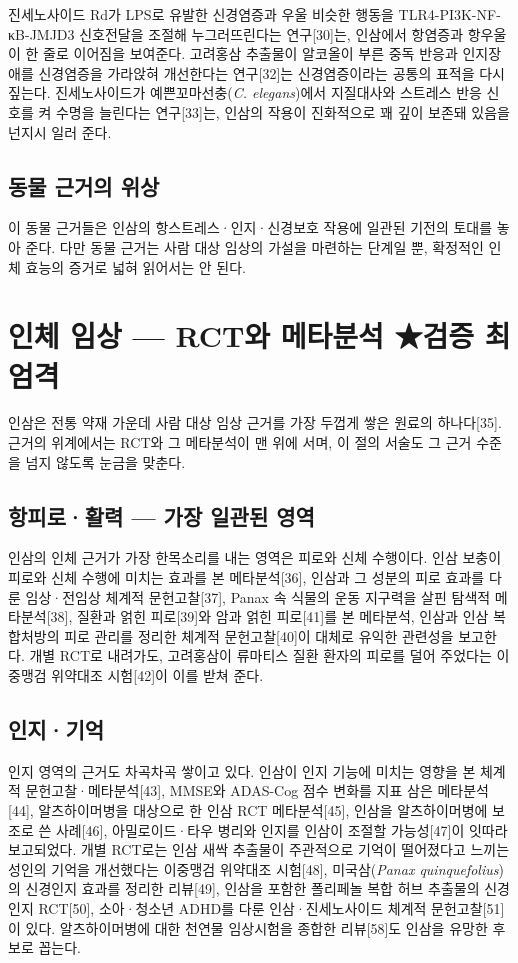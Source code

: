 \documentclass[12pt,oneside]{book}
\begin{document}
진세노사이드 Rd가 LPS로 유발한 신경염증과 우울 비슷한 행동을 TLR4-PI3K-NF-κB-JMJD3 신호전달을 조절해 누그러뜨린다는 연구[30]는, 인삼에서 항염증과 항우울이 한 줄로 이어짐을 보여준다. 고려홍삼 추출물이 알코올이 부른 중독 반응과 인지장애를 신경염증을 가라앉혀 개선한다는 연구[32]는 신경염증이라는 공통의 표적을 다시 짚는다. 진세노사이드가 예쁜꼬마선충(\textit{C. elegans})에서 지질대사와 스트레스 반응 신호를 켜 수명을 늘린다는 연구[33]는, 인삼의 작용이 진화적으로 꽤 깊이 보존돼 있음을 넌지시 일러 준다.

\subsection{동물 근거의 위상}

이 동물 근거들은 인삼의 항스트레스·인지·신경보호 작용에 일관된 기전의 토대를 놓아 준다. 다만 동물 근거는 사람 대상 임상의 가설을 마련하는 단계일 뿐, 확정적인 인체 효능의 증거로 넓혀 읽어서는 안 된다.

\section{인체 임상 — RCT와 메타분석 ★검증 최엄격}

인삼은 전통 약재 가운데 사람 대상 임상 근거를 가장 두껍게 쌓은 원료의 하나다[35]. 근거의 위계에서는 RCT와 그 메타분석이 맨 위에 서며, 이 절의 서술도 그 근거 수준을 넘지 않도록 눈금을 맞춘다.

\subsection{항피로·활력 — 가장 일관된 영역}

인삼의 인체 근거가 가장 한목소리를 내는 영역은 피로와 신체 수행이다. 인삼 보충이 피로와 신체 수행에 미치는 효과를 본 메타분석[36], 인삼과 그 성분의 피로 효과를 다룬 임상·전임상 체계적 문헌고찰[37], Panax 속 식물의 운동 지구력을 살핀 탐색적 메타분석[38], 질환과 얽힌 피로[39]와 암과 얽힌 피로[41]를 본 메타분석, 인삼과 인삼 복합처방의 피로 관리를 정리한 체계적 문헌고찰[40]이 대체로 유익한 관련성을 보고한다. 개별 RCT로 내려가도, 고려홍삼이 류마티스 질환 환자의 피로를 덜어 주었다는 이중맹검 위약대조 시험[42]이 이를 받쳐 준다.

\subsection{인지·기억}

인지 영역의 근거도 차곡차곡 쌓이고 있다. 인삼이 인지 기능에 미치는 영향을 본 체계적 문헌고찰·메타분석[43], MMSE와 ADAS-Cog 점수 변화를 지표 삼은 메타분석[44], 알츠하이머병을 대상으로 한 인삼 RCT 메타분석[45], 인삼을 알츠하이머병에 보조로 쓴 사례[46], 아밀로이드·타우 병리와 인지를 인삼이 조절할 가능성[47]이 잇따라 보고되었다. 개별 RCT로는 인삼 새싹 추출물이 주관적으로 기억이 떨어졌다고 느끼는 성인의 기억을 개선했다는 이중맹검 위약대조 시험[48], 미국삼(\textit{Panax quinquefolius})의 신경인지 효과를 정리한 리뷰[49], 인삼을 포함한 폴리페놀 복합 허브 추출물의 신경인지 RCT[50], 소아·청소년 ADHD를 다룬 인삼·진세노사이드 체계적 문헌고찰[51]이 있다. 알츠하이머병에 대한 천연물 임상시험을 종합한 리뷰[58]도 인삼을 유망한 후보로 꼽는다.
\end{document}
